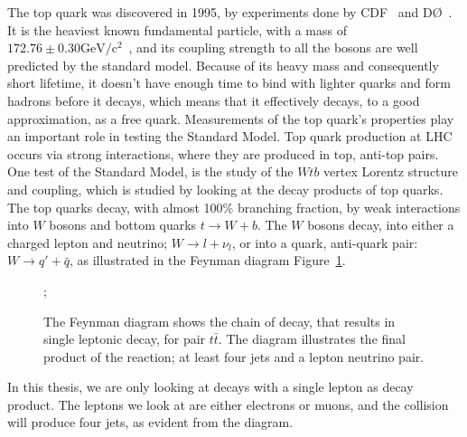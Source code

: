 \documentclass[12pt,a4paper]{article}
\numberwithin{equation}{section}
\begin{document}
The top quark was discovered in 1995, by experiments done by CDF~\cite{Abe_1995}
and DØ~\cite{Abachi_1995}. It is the heaviest known fundamental particle, with a
mass of $172.76 \pm 0.30 \mathrm{GeV/c^2}$~\cite{pdg}, and its coupling
strength to all the bosons are well predicted by the standard model. Because of
its heavy mass and consequently short lifetime, it doesn't have enough time to
bind with lighter quarks and form hadrons before it decays, which means that it
effectively decays, to a good approximation, as a free quark. Measurements of
the top quark's properties play an important role in testing the Standard
Model. Top quark production at LHC occurs via strong interactions, where they
are produced in top, anti-top pairs. One test of the Standard Model, is the
study of the $Wtb$ vertex Lorentz structure and coupling, which is studied by
looking at the decay products of top quarks. The top quarks decay, with almost
100\% branching fraction, by weak interactions into $W$ bosons and bottom quarks
$t \rightarrow W + b$. The $W$ bosons decay, into either a charged lepton and neutrino;
$W \rightarrow l + \nu_l$, or into a quark, anti-quark pair: $W \rightarrow q' + \bar{q}$, as
illustrated in the Feynman diagram Figure~\ref{fig:feynmandiagram}.\\

\begin{figure}[H]
  \begin{center}
    ;
  \end{center}
	\caption{The Feynman diagram shows the chain of decay, that results in single
    leptonic decay, for pair $t\bar t$. The diagram illustrates the final
    product of the reaction; at least four jets and a lepton neutrino
    pair.}\label{fig:feynmandiagram}
\end{figure}

In this thesis, we are only looking at decays with a single lepton as decay
product. The leptons we look at are either electrons or muons, and the collision
will produce four jets, as evident from the diagram.
\end{document}
